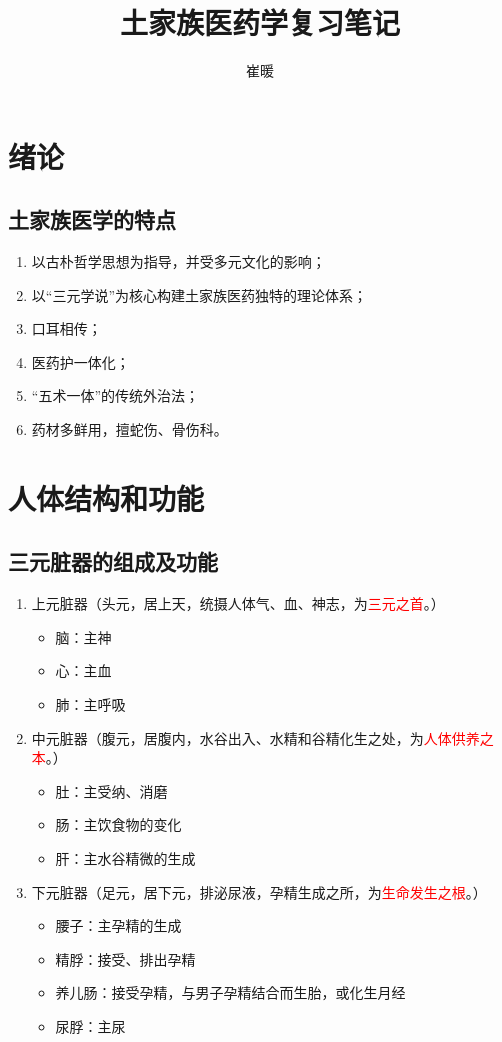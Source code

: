 \documentclass[cn,hazy,blue,12pt,normal,founder]{elegantnote}
\title{土家族医药学复习笔记}
\author{崔暖}
\date{\zhtoday}
\newcommand{\redt}[1]{\textcolor{red}{{}#1}}      %
\begin{document}
\maketitle

\section{绪论}

\subsection{土家族医学的特点}

\begin{enumerate}
  \item 以古朴哲学思想为指导，并受多元文化的影响；
  \item 以“三元学说”为核心构建土家族医药独特的理论体系；
  \item 口耳相传；
  \item 医药护一体化；
  \item “五术一体”的传统外治法；
  \item 药材多鲜用，擅蛇伤、骨伤科。
\end{enumerate}

\section{人体结构和功能}

\subsection{三元脏器的组成及功能}

\begin{enumerate}
  \item 上元脏器（头元，居上天，统摄人体气、血、神志，为\redt{三元之首}。）
  \begin{itemize}
    \item 脑：主神
    \item 心：主血
    \item 肺：主呼吸
  \end{itemize}
  \item 中元脏器（腹元，居腹内，水谷出入、水精和谷精化生之处，为\redt{人体供养之本}。）
  \begin{itemize}
    \item 肚：主受纳、消磨
    \item 肠：主饮食物的变化
    \item 肝：主水谷精微的生成
  \end{itemize}
  \item 下元脏器（足元，居下元，排泌尿液，孕精生成之所，为\redt{生命发生之根}。）
  \begin{itemize}
    \item 腰子：主孕精的生成
    \item 精脬：接受、排出孕精
    \item 养儿肠：接受孕精，与男子孕精结合而生胎，或化生月经
    \item 尿脬：主尿
  \end{itemize}
\end{enumerate}
\end{document}
